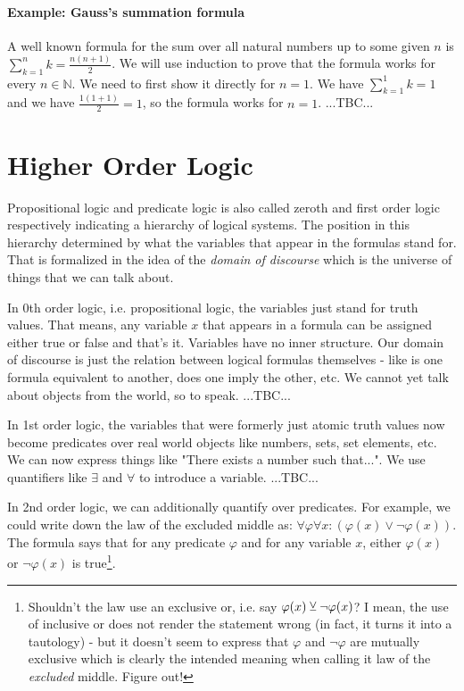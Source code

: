 \paragraph{Example: Gauss's summation formula} A well known formula for the sum over all natural numbers up to some given $n$ is $\sum_{k=1}^n k = \frac{n (n+1)}{2}$. We will use induction to prove that the formula works for every $n \in \mathbb{N}$. We need to first show it directly for $n=1$. We have $\sum_{k=1}^1 k = 1$ and we have $\frac{1 (1+1)}{2} = 1$, so the formula works for $n=1$. ...TBC...





\section{Higher Order Logic}
Propositional logic and predicate logic is also called zeroth and first order logic respectively indicating a hierarchy of logical systems. The position in this hierarchy determined by what the variables that appear in the formulas stand for. That is formalized in the idea of the \emph{domain of discourse} which is the universe of things that we can talk about.

\medskip
In 0th order logic, i.e. propositional logic, the variables just stand for truth values. That means, any variable $x$ that appears in a formula can be assigned either true or false and that's it. Variables have no inner structure. Our domain of discourse is just the relation between logical formulas themselves - like is one formula equivalent to another, does one imply the other, etc. We cannot yet talk about objects from the world, so to speak. ...TBC...


\medskip
In 1st order logic, the variables that were formerly just atomic truth values now become predicates over real world objects like numbers, sets, set elements, etc. We can now express things like "There exists a number such that...". We use quantifiers like $\exists$ and $\forall$ to introduce a variable. ...TBC...

\medskip
In 2nd order logic, we can additionally quantify over predicates. For example, we could write down the law of the excluded middle as: $\forall \varphi \forall x: (\varphi(x) \vee \neg \varphi(x))$. The formula says that for any predicate $\varphi$ and for any variable $x$, either $\varphi(x)$ or $\neg \varphi(x)$ is true\footnote{Shouldn't the law use an exclusive or, i.e. say $\varphi(x) \mathbin{\veebar} \neg \varphi(x)$? I mean, the use of inclusive or does not render the statement wrong (in fact, it turns it into a tautology) - but it doesn't seem to express that $\varphi$ and $\neg \varphi$ are mutually exclusive which is clearly the intended meaning when calling it law of the \emph{excluded} middle. Figure out!}.


